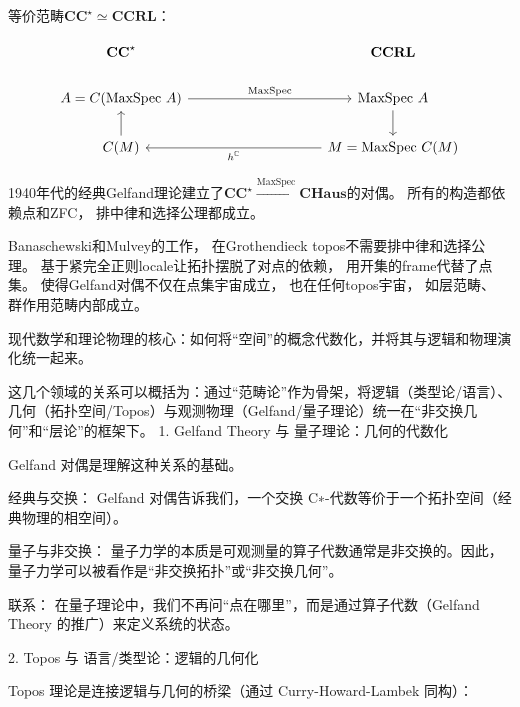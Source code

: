 \documentclass[10pt, openany]{book}
\begin{document}
等价范畴$\textbf{CC}^\star \simeq \textbf{CCRL}$：

$$
\begin{tikzcd}
\textbf{CC}^\star                                        &  &  &  & \textbf{CCRL}                                         \\
A = C(\text{MaxSpec} \ A) \arrow[rrrr, "\text{MaxSpec}"] &  &  &  & \text{MaxSpec} \ A \arrow[d]                          \\
C(M) \arrow[u]                                           &  &  &  & M = \text{MaxSpec} \ C(M) \arrow[llll, "h^\mathbb C"]
\end{tikzcd}
$$

1940年代的经典Gelfand理论建立了$\textbf{CC}^\star \stackrel{\text{MaxSpec}}{\longrightarrow} \textbf{CHaus}$的对偶。
所有的构造都依赖点和ZFC，
排中律和选择公理都成立。

Banaschewski和Mulvey的工作，
在Grothendieck topos不需要排中律和选择公理。
基于紧完全正则locale让拓扑摆脱了对点的依赖，
用开集的frame代替了点集。
使得Gelfand对偶不仅在点集宇宙成立，
也在任何topos宇宙，
如层范畴、
群作用范畴内部成立。


现代数学和理论物理的核心：如何将“空间”的概念代数化，并将其与逻辑和物理演化统一起来。

这几个领域的关系可以概括为：通过“范畴论”作为骨架，将逻辑（类型论/语言）、几何（拓扑空间/Topos）与观测物理（Gelfand/量子理论）统一在“非交换几何”和“层论”的框架下。
1. Gelfand Theory 与 量子理论：几何的代数化

Gelfand 对偶是理解这种关系的基础。

    经典与交换： Gelfand 对偶告诉我们，一个交换 C∗-代数等价于一个拓扑空间（经典物理的相空间）。

    量子与非交换： 量子力学的本质是可观测量的算子代数通常是非交换的。因此，量子力学可以被看作是“非交换拓扑”或“非交换几何”。

    联系： 在量子理论中，我们不再问“点在哪里”，而是通过算子代数（Gelfand Theory 的推广）来定义系统的状态。

2. Topos 与 语言/类型论：逻辑的几何化

Topos 理论是连接逻辑与几何的桥梁（通过 Curry-Howard-Lambek 同构）：
\end{document}
